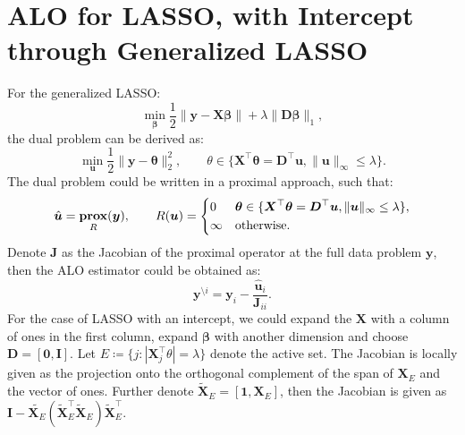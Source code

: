 \documentclass[11pt]{article}
\newcommand{\bu}{\bm{u}}
\newcommand{\by}{\bm{y}}
\newcommand{\bD}{\bm{D}}
\newcommand{\bI}{\bm{I}}
\newcommand{\bJ}{\bm{J}}
\newcommand{\bX}{\bm{X}}
\newcommand{\bbeta}{\bm{\beta}}
\newcommand{\btheta}{\bm{\theta}}
\DeclareMathOperator{\bprox}{\mathbf{prox}}
\begin{document}
\section{ALO for LASSO, with Intercept through Generalized LASSO}
For the generalized LASSO:
	\begin{equation}
	\min\limits_{\bbeta}\frac{1}{2}\|\by-\bX\bbeta\|+\lambda\|\bD\bbeta\|_{1},
	\end{equation}
the dual problem can be derived as:
	\begin{equation}
	\min\limits_{\bu}\frac{1}{2}\|\by-\btheta\|_{2}^{2},\qquad\theta\in \{\bX^{\top}\btheta = \bD^{\top}\bu, \|\bu\|_{\infty} \leq \lambda\}.
	\end{equation}
The dual problem could be written in a proximal approach, such that: \[\hat{\bu} = \bprox_{R}(\by),\qquad R(\bu) =\begin{dcases}
0 & \btheta \in \{\bX^{\top}\btheta = \bD^{\top}\bu, \|\bu\|_{\infty} \leq \lambda\},\\
\infty & \text{otherwise.}
\end{dcases}\] Denote $\bJ$ as the Jacobian of the proximal operator at the full data problem $\by$, then the ALO estimator could be obtained as: 
	\begin{equation}
	\by^{\setminus i} = \by_{i} - \frac{\hat{\bu}_{i}}{\bJ_{ii}}.
	\end{equation}
For the case of LASSO with an intercept, we could expand the $\bX$ with a column of ones in the first column, expand $\bbeta$ with another dimension and choose $\bD = [\bm{0}, \bI]$. Let \(E\coloneqq\{j:|\bX_{j}^{\top}\theta| = \lambda \}\) denote the active set. The Jacobian is locally given as the projection onto the orthogonal complement of the span of $\bX_{E}$ and the vector of ones. Further denote $\tilde{\bX}_{E} = [\textbf{1}, \bX_{E}]$, then the Jacobian is given as $\bI - \tilde{\bX_{E}}(\tilde{\bX}_{E}^{\top}\tilde{\bX}_{E})\tilde{\bX}_{E}^{\top}$.
\end{document}
